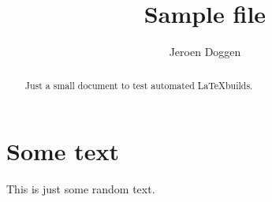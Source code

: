 \documentclass[a4paper,10pt]{article}
\title{Sample file}
\author{Jeroen Doggen}
\begin{document}
\maketitle

\begin{abstract}
Just a small document to test automated \LaTeX builds.
\end{abstract}

\section{Some text}

This is just some random text.
\end{document}
